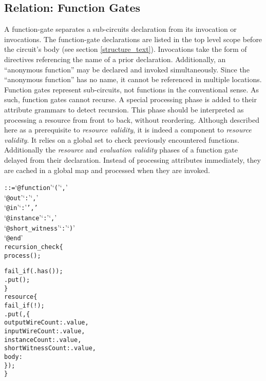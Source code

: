 \subsection{Relation: Function Gates}\label{function_gate_text}
A function-gate separates a sub-circuits declaration from its invocation or invocations.
The function-gate declarations are listed in the top level scope before the circuit's body (see section \ref{structure_text}).
Invocations take the form of directives referencing the name of a prior declaration.
Additionally, an ``anonymous function'' may be declared and invoked simultaneously.
Since the ``anonymous function'' has no name, it cannot be referenced in multiple locations.\\

Function gates represent sub-circuits, not functions in the conventional sense.
As such, function gates cannot recurse.
A special processing phase is added to their attribute grammars to detect recursion.
This phase should be interpreted as processing a resource from front to back, without reordering.
Although described here as a prerequisite to \textit{resource validity}, it is indeed a component to \textit{resource validity}.
It relies on a  global set to check previously encountered functions.
Additionally the \textit{resource} and \textit{evaluation validity} phases of a function gate delayed from their declaration.
Instead of processing attributes immediately, they are cached in a global map  and processed when they are invoked.

\begin{alltt}\ttSyn
   ::= `@function' `('  `,'
                     `@out' `:'  `,'
                     `@in' `:'  ','
                     `@instance' `:'  `,'
                     `@short\_witness' `:'  `)'
                  `@end'\ttSem
  recursion_check \{
    process();

    fail_if(.has());
    .put();
  \}
  resource \{
    fail_if(!);
    .put(, \{
          outputWireCount: .value,
          inputWireCount: .value,
          instanceCount: .value,
          shortWitnessCount: .value,
          body: 
        \});
  \}
\end{alltt}

